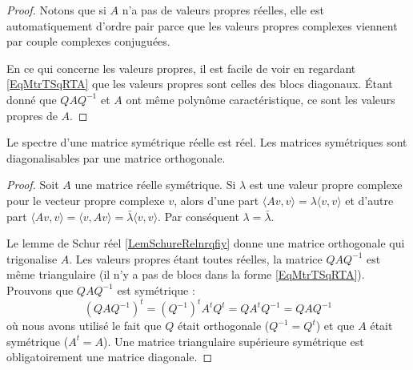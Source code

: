 \begin{proof}
    Notons que si \( A\) n'a pas de valeurs propres réelles, elle est automatiquement d'ordre pair parce que les valeurs propres complexes viennent par couple complexes conjuguées.

    En ce qui concerne les valeurs propres, il est facile de voir en regardant \eqref{EqMtrTSqRTA} que les valeurs propres sont celles des blocs diagonaux. Étant donné que \( QAQ^{-1}\) et \( A\) ont même polynôme caractéristique, ce sont les valeurs propres de \( A\).
\end{proof}

\begin{theorem} \label{ThoeTMXla}
    Le spectre d'une matrice symétrique réelle est réel. Les matrices symétriques sont diagonalisables par une matrice orthogonale.
\end{theorem}


\begin{proof}
    Soit \( A\) une matrice réelle symétrique. Si \( \lambda\) est une valeur propre complexe pour le vecteur propre complexe \( v\), alors d'une part \( \langle Av, v\rangle =\lambda\langle v, v\rangle \) et d'autre part \( \langle Av, v\rangle =\langle v, Av\rangle =\bar\lambda\langle v, v\rangle \). Par conséquent \( \lambda=\bar\lambda\).
    
    Le lemme de Schur réel \ref{LemSchureRelnrqfiy} donne une matrice orthogonale qui trigonalise \( A\). Les valeurs propres étant toutes réelles, la matrice \( QAQ^{-1}\) est même triangulaire (il n'y a pas de blocs dans la forme \eqref{EqMtrTSqRTA}). Prouvons que \( QAQ^{-1}\) est symétrique :
    \begin{equation}
        (QAQ^{-1})^t=(Q^{-1})^tA^tQ^t=QA^tQ^{-1}=QAQ^{-1}
    \end{equation}
    où nous avons utilisé le fait que \( Q\) était orthogonale (\( Q^{-1}=Q^t\)) et que \( A\) était symétrique (\( A^t=A\)). Une matrice triangulaire supérieure symétrique est obligatoirement une matrice diagonale.
\end{proof}

